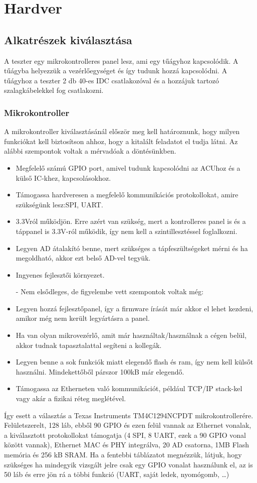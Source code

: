 \documentclass[a4paper, 12pt]{article}
\newcommand{\tab}{\hspace*{1em}}
\begin{document}
\section{Hardver}
\subsection{Alkatrészek kiválasztása}
\tab A teszter egy mikrokontrolleres panel lesz, ami egy tűágyhoz kapcsolódik. A tűágyba helyezzük a vezérlőegységet és így tudunk hozzá kapcsolódni. A tűágyhoz a teszter 2 db 40-es IDC csatlakozóval és a hozzájuk tartozó szalagkábelekkel fog csatlakozni.

\subsubsection{Mikrokontroller}
\tab A mikrokontroller kiválasztásánál először meg kell határoznunk, hogy milyen funkciókat kell biztosítson ahhoz, hogy a kitalált feladatot el tudja látni. Az alábbi szempontok voltak a mérvadóak a döntésünkben.
\begin{itemize}
\item Megfelelő számú GPIO port, amivel tudunk kapcsolódni az ACUhoz és a külső IC-khez, kapcsolásokhoz.
\item Támogassa hardveresen a megfelelő kommunikációs protokollokat, amire szükségünk lesz:SPI, UART.
\item 3.3Vról működjön. Erre azért van szükség, mert a kontrolleres panel is és a táppanel is 3.3V-ról működik, így nem kell a szintillesztéssel foglalkozni.
\item Legyen AD átalakító benne, mert szükséges a tápfeszültségeket mérni és ha megoldható, akkor ezt belső AD-vel tegyük.
\item Ingyenes fejlesztői környezet.
\item[-] Nem elsődleges, de figyelembe vett szempontok voltak még:
\item Legyen hozzá fejlesztőpanel, így a firmware írását már akkor el lehet kezdeni, amikor még nem került legyártásra a panel.
\item Ha van olyan mikrovezérlő, amit már használtak/használnak a cégen belül, akkor tudnak tapasztalattal segíteni a kollegák.
\item Legyen benne a sok funkciók miatt elegendő flash és ram, így nem kell külsőt használni. Mindekettőből párszor 100kB már elegendő.
\item Támogassa az Etherneten való kommunikációt, például TCP/IP stack-kel vagy akár a fizikai réteg meglétével.
\end{itemize}
\tab Így esett a választás a Texas Instruments TM4C1294NCPDT\textregistered{} \cite{tm4c} mikrokontrollerére. Felületszerelt, 128 láb, ebből 90 GPIO és ezen felül vannak az Ethernet vonalak, a kiválasztott protokollokat támogatja (4 SPI, 8 UART, ezek a 90 GPIO vonal között vannak), Ethernet MAC és PHY integrálva, 20 AD csatorna, 1MB Flash memória és 256 kB SRAM. Ha a fentebbi táblázatot megnézzük, látjuk, hogy szükséges ha mindegyik vizsgált jelre csak egy GPIO vonalat használunk el, az is 50 láb és erre jön rá a többi funkció (UART, saját ledek, nyomógomb, \dots)
\end{document}
